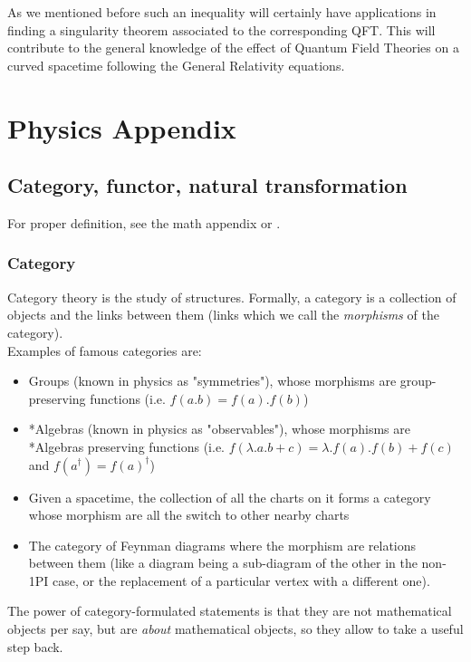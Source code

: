 \documentclass[a4paper,11pt]{article}
\numberwithin{equation}{section}
\theoremstyle{definition}
\begin{document}
As we mentioned before such an inequality will certainly have applications in finding a singularity theorem associated to the corresponding QFT. This will contribute to the general knowledge of the effect of Quantum Field Theories on a curved spacetime following the General Relativity equations.
\newpage
\appendix
\section{Physics Appendix}
    \subsection{Category, functor, natural transformation} \label{AnPhCat}
    For proper definition, see the math appendix or \cite{AlgLang}.
        \subsubsection{Category}
    Category theory is the study of structures. Formally, a category is a collection of objects and the links between them (links which we call the \emph{morphisms} of the category).\\
    Examples of famous categories are:
    \begin{itemize}
        \item Groups (known in physics as "symmetries"), whose morphisms are group-preserving functions (i.e. $f(a.b)=f(a).f(b)$)
        \item *Algebras (known in physics as "observables"), whose morphisms are *Algebras preserving functions (i.e. $f(\lambda.a.b+c)=\lambda.f(a).f(b)+f(c)$ and $f(a^\dag)=f(a)^\dag$)
        \item Given a spacetime, the collection of all the charts on it forms a category whose morphism are all the switch to other nearby charts
        \item The category of Feynman diagrams where the morphism are relations between them (like a diagram being a sub-diagram of the other in the non-1PI case, or the replacement of a particular vertex with a different one).
    \end{itemize}
    The power of category-formulated statements is that they are not mathematical objects per say, but are \emph{about} mathematical objects, so they allow to take a useful step back.
    
\end{document}
